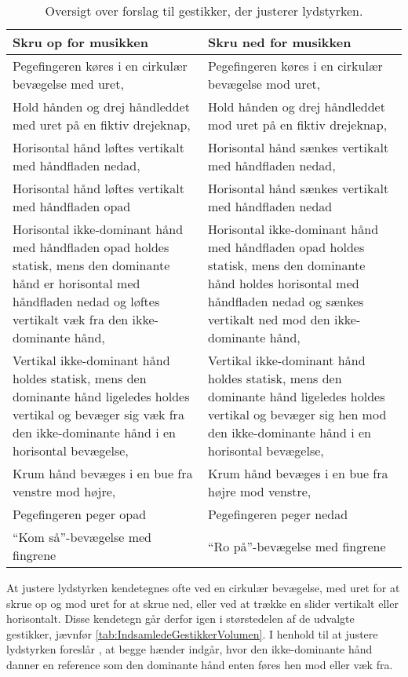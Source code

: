 \begin{table}[H]
	\centering
	\begin{tabular}{| p{6cm} | p{6cm} |}
		\hline
		\textbf{Skru op for musikken} & \textbf{Skru ned for musikken} \\ \hline
		Pegefingeren køres i en cirkulær bevægelse med uret, \parencite{WEB:BeosoundMoment, WEB:BMW7} & Pegefingeren køres i en cirkulær bevægelse mod uret, \parencite{WEB:BeosoundMoment, WEB:BMW7} \\ \hline
		Hold hånden og drej håndleddet med uret på en fiktiv drejeknap, \parencite{WEB:Beosound2} & Hold hånden og drej håndleddet mod uret på en fiktiv drejeknap, \parencite{WEB:Beosound2} \\ \hline
		Horisontal hånd løftes vertikalt med håndfladen nedad, \parencite[s. 166]{PDF:ComparingInputModalities} & Horisontal hånd sænkes vertikalt med håndfladen nedad, \parencite[s. 166]{PDF:ComparingInputModalities} \\ \hline
		Horisontal hånd løftes vertikalt med håndfladen opad & Horisontal hånd sænkes vertikalt med håndfladen nedad \\ \hline
		Horisontal ikke-dominant hånd med håndfladen opad holdes statisk, mens den dominante hånd er horisontal med håndfladen nedad og løftes vertikalt væk fra den ikke-dominante hånd, \parencite[s. 48]{PDF:UserDefinedGesturesTV} & Horisontal ikke-dominant hånd med håndfladen opad holdes statisk, mens den dominante hånd holdes horisontal med håndfladen nedad og sænkes vertikalt ned mod den ikke-dominante hånd, \parencite[s. 48]{PDF:UserDefinedGesturesTV} \\ \hline
		Vertikal ikke-dominant hånd holdes statisk, mens den dominante hånd ligeledes holdes vertikal og bevæger sig væk fra den ikke-dominante hånd i en horisontal bevægelse, \parencite[s. 48]{PDF:UserDefinedGesturesTV} & Vertikal ikke-dominant hånd holdes statisk, mens den dominante hånd ligeledes holdes vertikal og bevæger sig hen mod den ikke-dominante hånd i en horisontal bevægelse, \parencite[s. 48]{PDF:UserDefinedGesturesTV} \\ \hline
		Krum hånd bevæges i en bue fra venstre mod højre, \parencite{WEB:BeoplayA9} & Krum hånd bevæges i en bue fra højre mod venstre, \parencite{WEB:BeoplayA9} \\ \hline
		Pegefingeren peger opad & Pegefingeren peger nedad \\ \hline
		\enquote{Kom så}-bevægelse med fingrene & \enquote{Ro på}-bevægelse med fingrene \\ \hline		
	\end{tabular}
	\caption{Oversigt over forslag til gestikker, der justerer lydstyrken.}
	\label{tab:IndsamledeGestikkerVolumen}
\end{table}
\noindent
%
At justere lydstyrken kendetegnes ofte ved en cirkulær bevægelse, med uret for at skrue op og mod uret for at skrue ned, eller ved at trække en slider vertikalt eller horisontalt. Disse kendetegn går derfor igen i størstedelen af de udvalgte gestikker, jævnfør \autoref{tab:IndsamledeGestikkerVolumen}. I henhold til at justere lydstyrken foreslår \textcite[s. 48]{PDF:UserDefinedGesturesTV}, at begge hænder indgår, hvor den ikke-dominante hånd danner en reference som den dominante hånd enten føres hen mod eller væk fra.

